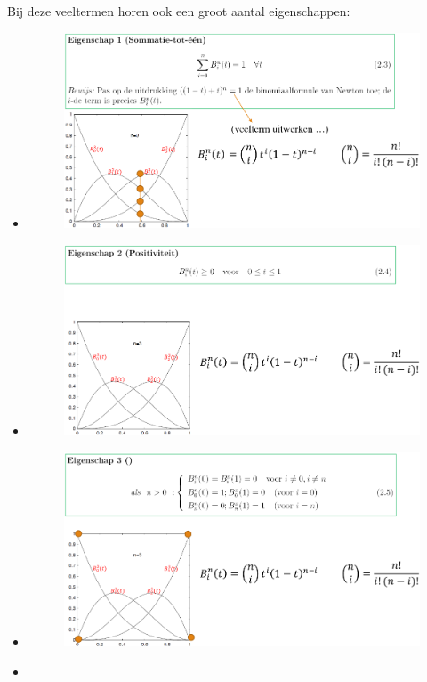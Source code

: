\documentclass[12pt,a4paper]{article}
\begin{document}
	Bij deze veeltermen horen ook een groot aantal eigenschappen: 
	\begin{itemize}
		\item \begin{figure}[H]
			\centering
			\includegraphics[width=0.7\linewidth]{afbeeldingen/Beziercurven/Eigenschap1}
			\label{fig:eigenschap1}
		\end{figure}
		\item 
		\begin{figure}[H]
			\centering
			\includegraphics[width=0.7\linewidth]{afbeeldingen/Beziercurven/Eigenshap2}
			\label{fig:eigenshap2}
		\end{figure}
		\item 
		\begin{figure}[H]
			\centering
			\includegraphics[width=0.7\linewidth]{afbeeldingen/Beziercurven/Eigenschap3}
			\label{fig:eigenschap3}
		\end{figure}
		\item 
		\begin{figure}[H]

\end{figure}
\end{itemize}
\end{document}
